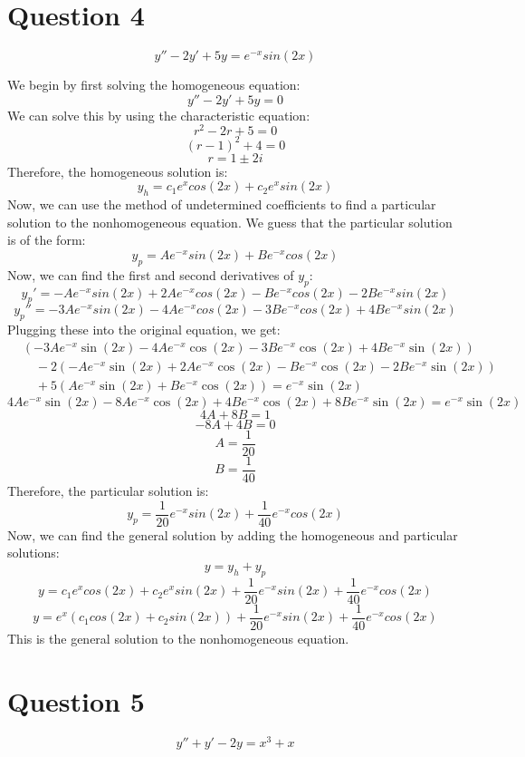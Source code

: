 \documentclass{article}
\begin{document}
\section*{Question 4}

\[
y'' - 2y' + 5y = e^{-x}sin(2x)
\]

We begin by first solving the homogeneous equation:
\[
y'' - 2y' + 5y = 0
\]
We can solve this by using the characteristic equation:
\[
r^2 - 2r + 5 = 0
\]
\[
(r - 1)^2 + 4 = 0
\]
\[
r = 1 \pm 2i
\]
Therefore, the homogeneous solution is:
\[
y_h = c_1e^{x}cos(2x) + c_2e^{x}sin(2x)
\]
Now, we can use the method of undetermined coefficients to find a particular solution to the nonhomogeneous equation. We guess that the particular solution is of the form:
\[
y_p = Ae^{-x}sin(2x) + Be^{-x}cos(2x)
\]
Now, we can find the first and second derivatives of $y_p$:
\[
y_p' = -Ae^{-x}sin(2x) + 2Ae^{-x}cos(2x) - Be^{-x}cos(2x) - 2Be^{-x}sin(2x)
\] %
\[
y_p'' = -3Ae^{-x}sin(2x) - 4Ae^{-x}cos(2x) - 3Be^{-x}cos(2x) + 4Be^{-x}sin(2x)
\] %
Plugging these into the original equation, we get:
\begin{align*}
    & (-3Ae^{-x}\sin(2x) - 4Ae^{-x}\cos(2x) - 3Be^{-x}\cos(2x) + 4Be^{-x}\sin(2x)) \\
    & \quad - 2(-Ae^{-x}\sin(2x) + 2Ae^{-x}\cos(2x) - Be^{-x}\cos(2x) - 2Be^{-x}\sin(2x)) \\
    & \quad + 5(Ae^{-x}\sin(2x) + Be^{-x}\cos(2x)) = e^{-x}\sin(2x)
\end{align*}
\[
    4Ae^{-x}\sin(2x) - 8Ae^{-x}\cos(2x) + 4Be^{-x}\cos(2x) + 8Be^{-x}\sin(2x) = e^{-x}\sin(2x)
\]
\[
    4A+8B=1
\]
\[
    -8A+4B=0
\]
\[
    A=\frac{1}{20}
\]
\[
    B=\frac{1}{40}
\]
Therefore, the particular solution is:
\[
y_p = \frac{1}{20}e^{-x}sin(2x) + \frac{1}{40}e^{-x}cos(2x)
\]
Now, we can find the general solution by adding the homogeneous and particular solutions:
\[
y = y_h + y_p
\]
\[
y = c_1e^{x}cos(2x) + c_2e^{x}sin(2x) + \frac{1}{20}e^{-x}sin(2x) + \frac{1}{40}e^{-x}cos(2x)
\]
\[
y = e^{x}(c_1cos(2x) + c_2sin(2x)) + \frac{1}{20}e^{-x}sin(2x) + \frac{1}{40}e^{-x}cos(2x)
\]
This is the general solution to the nonhomogeneous equation.

\section*{Question 5}
\[
y'' + y'  - 2y = x^{3} + x
\]
\end{document}
